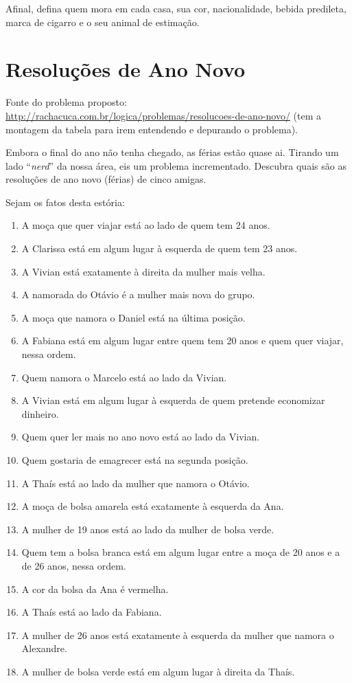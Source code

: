 \documentclass[a4paper,12pt]{article}
\begin{document}
Afinal, defina quem mora em cada casa, sua cor, nacionalidade, bebida predileta, 
marca de cigarro e o seu animal de estimação.

\newpage
  \section{Resoluções de Ano Novo}
  
  
   Fonte do problema proposto:
 \url{http://rachacuca.com.br/logica/problemas/resolucoes-de-ano-novo/} 
  (tem a montagem da tabela para irem entendendo e depurando o problema).

Embora o final do ano não tenha chegado, as férias estão quase ai. Tirando
um lado ``{\em nerd}'' da nossa área, eis um problema incrementado.
Descubra quais são as resoluções de ano novo (férias) de cinco amigas.

  
Sejam os fatos desta estória:
  
\begin{enumerate}
\item  A moça que quer viajar está ao lado de quem tem 24 anos.
\item   A Clarissa está em algum lugar à esquerda de quem tem 23 anos.
\item   A Vivian está exatamente à direita da mulher mais velha.
\item   A namorada do Otávio é a mulher mais nova do grupo.
\item   A moça que namora o Daniel está na última posição.
\item   A Fabiana está em algum lugar entre quem tem 20 anos e quem quer viajar, nessa ordem.
\item   Quem namora o Marcelo está ao lado da Vivian.
\item   A Vivian está em algum lugar à esquerda de quem pretende economizar dinheiro.
\item   Quem quer ler mais no ano novo está ao lado da Vivian.
\item   Quem gostaria de emagrecer está na segunda posição.
\item   A Thaís está ao lado da mulher que namora o Otávio.
\item   A moça de bolsa amarela está exatamente à esquerda da Ana.
\item   A mulher de 19 anos está ao lado da mulher de bolsa verde.
\item   Quem tem a bolsa branca está em algum lugar entre a moça de 20 
        anos e a de 26 anos, nessa ordem.
\item   A cor da bolsa da Ana é vermelha.
\item   A Thaís está ao lado da Fabiana.
\item   A mulher de 26 anos está exatamente à esquerda da mulher que namora o Alexandre.
\item   A mulher de bolsa verde está em algum lugar à direita da Thaís.

\end{enumerate}  
\end{document}
